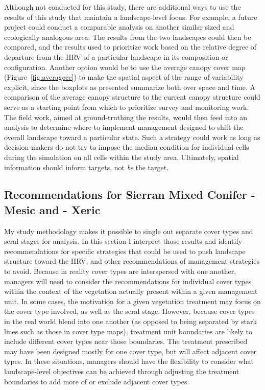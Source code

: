 Although not conducted for this study, there are additional ways to use the results of this study that maintain a landscape-level focus. For example, a future project could conduct a comparable analysis on another similar sized and ecologically analogous area. The results from the two landscapes could then be compared, and the results used to prioritize work based on the relative degree of departure from the HRV of a particular landscape in its composition or configuration. Another option would be to use the average canopy cover map (Figure~\ref{fig:averagecc}) to make the spatial aspect of the range of variability explicit, since the boxplots as presented summarize both over space and time. A comparison of the average canopy structure to the current canopy structure could serve as a starting point from which to prioritize survey and monitoring work. The field work, aimed at ground-truthing the results, would then feed into an analysis to determine where to implement management designed to shift the overall landscape toward a particular state. Such a strategy could work as long as decision-makers do not try to impose the median condition for individual cells during the simulation on all cells within the study area. Ultimately, spatial information should inform targets, not \emph{be} the target.

\subsection{Recommendations for Sierran Mixed Conifer - Mesic and - Xeric}
My study methodology makes it possible to single out separate cover types and seral stages for analysis. In this section I interpret those results and identify recommendations for specific strategies that could be used to push landscape structure toward the HRV, and other recommendations of management strategies to avoid. Because in reality cover types are interspersed with one another, managers will need to consider the recommendations for individual cover types within the context of the vegetation actually present within a given management unit. In some cases, the motivation for a given vegetation treatment may focus on the cover type involved, as well as the seral stage. However, because cover types in the real world blend into one another (as opposed to being separated by stark lines such as those in cover type maps), treatment unit boundaries are likely to include different cover types near those boundaries. The treatment prescribed may have been designed mostly for one cover type, but will affect adjacent cover types. In these situations, managers should have the flexibility to consider what landscape-level objectives can be achieved through adjusting the treatment boundaries to add more of or exclude adjacent cover types.

